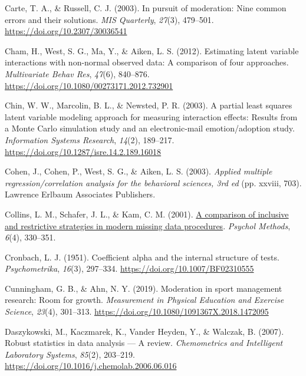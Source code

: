 \documentclass[
  man]{apa6}
\newlength{\cslhangindent}
\newlength{\cslentryspacingunit} %
\newenvironment{CSLReferences}[2] %
 {%
  \setlength{\parindent}{0pt}
  \ifodd #1
  \let\oldpar\par
  \def\par{\hangindent=\cslhangindent\oldpar}
  \fi
  \setlength{\parskip}{#2\cslentryspacingunit}
 }%
 {}
\begin{document}
\begin{CSLReferences}{1}{0}
\leavevmode{}%
Carte, T. A., \& Russell, C. J. (2003). In pursuit of moderation: {Nine} common errors and their solutions. \emph{MIS Quarterly}, \emph{27}(3), 479--501. \url{https://doi.org/10.2307/30036541}

\leavevmode{}%
Cham, H., West, S. G., Ma, Y., \& Aiken, L. S. (2012). Estimating latent variable interactions with non-normal observed data: {A} comparison of four approaches. \emph{Multivariate Behav Res}, \emph{47}(6), 840--876. \url{https://doi.org/10.1080/00273171.2012.732901}

\leavevmode{}%
Chin, W. W., Marcolin, B. L., \& Newsted, P. R. (2003). A partial least squares latent variable modeling approach for measuring interaction effects: {Results} from a {Monte Carlo} simulation study and an electronic-mail emotion/adoption study. \emph{Information Systems Research}, \emph{14}(2), 189--217. \url{https://doi.org/10.1287/isre.14.2.189.16018}

\leavevmode{}%
Cohen, J., Cohen, P., West, S. G., \& Aiken, L. S. (2003). \emph{Applied multiple regression/correlation analysis for the behavioral sciences, 3rd ed} (pp. xxviii, 703). Lawrence Erlbaum Associates Publishers.

\leavevmode{}%
Collins, L. M., Schafer, J. L., \& Kam, C. M. (2001). \href{https://www.ncbi.nlm.nih.gov/pubmed/11778676}{A comparison of inclusive and restrictive strategies in modern missing data procedures}. \emph{Psychol Methods}, \emph{6}(4), 330--351.

\leavevmode{}%
Cronbach, L. J. (1951). Coefficient alpha and the internal structure of tests. \emph{Psychometrika}, \emph{16}(3), 297--334. \url{https://doi.org/10.1007/BF02310555}

\leavevmode{}%
Cunningham, G. B., \& Ahn, N. Y. (2019). Moderation in sport management research: {Room} for growth. \emph{Measurement in Physical Education and Exercise Science}, \emph{23}(4), 301--313. \url{https://doi.org/10.1080/1091367X.2018.1472095}

\leavevmode{}%
Daszykowski, M., Kaczmarek, K., Vander Heyden, Y., \& Walczak, B. (2007). Robust statistics in data analysis --- {A} review. \emph{Chemometrics and Intelligent Laboratory Systems}, \emph{85}(2), 203--219. \url{https://doi.org/10.1016/j.chemolab.2006.06.016}


\end{CSLReferences}
\end{document}
